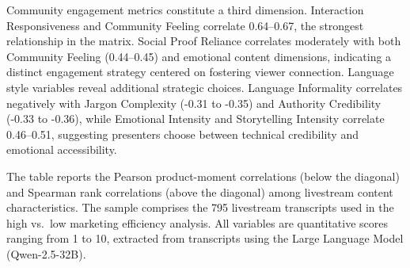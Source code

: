 Community engagement metrics constitute a third dimension. Interaction Responsiveness and Community Feeling correlate 0.64--0.67, the strongest relationship in the matrix. Social Proof Reliance correlates moderately with both Community Feeling (0.44--0.45) and emotional content dimensions, indicating a distinct engagement strategy centered on fostering viewer connection.
Language style variables reveal additional strategic choices. Language Informality correlates negatively with Jargon Complexity (-0.31 to -0.35) and Authority Credibility (-0.33 to -0.36), while Emotional Intensity and Storytelling Intensity correlate 0.46--0.51, suggesting presenters choose between technical credibility and emotional accessibility.

\begin{landscape}

\begin{table}[!ht]

\centering
    
    \caption{Correlations among Livestream Content Characteristics}
 
    \footnotesize
    \vspace{0.3cm}
  \noindent
  \begin{minipage}{\linewidth}
  The table reports the Pearson product-moment correlations (below the diagonal) and Spearman rank correlations (above the diagonal) among livestream content characteristics. The sample comprises the 795 livestream transcripts used in the high vs.~low marketing efficiency analysis. All variables are quantitative scores ranging from 1 to 10, extracted from transcripts using the Large Language Model (Qwen-2.5-32B). \\ %
  \end{minipage}\label{correlations}


\end{table}
\end{landscape}

